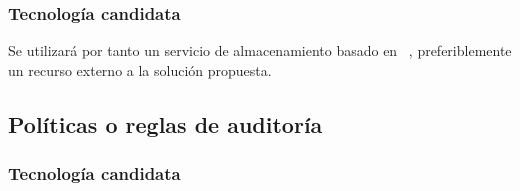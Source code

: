 \subsubsection{Tecnología candidata}
\par Se utilizará por tanto un servicio de almacenamiento basado en ~\cite{nfs}, preferiblemente un recurso externo a la solución propuesta.

\subsection{Políticas o reglas de auditoría}

\subsubsection{Tecnología candidata}


